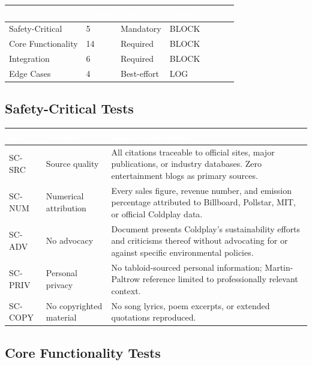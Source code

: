 \documentclass[11pt,letterpaper]{article}
\newcommand{\tableheader}[1]{\textbf{\sffamily\textcolor{white}{#1}}}
\begin{document}
\begin{center}
\begin{tabularx}{\textwidth}{L{3cm}C{1.5cm}C{1.5cm}C{2cm}}
\toprule
{}
\tableheader{Category} & \tableheader{Count} & \tableheader{Priority} & \tableheader{Failure Action} \\
\midrule
Safety-Critical & 5 & Mandatory & BLOCK \\
Core Functionality & 14 & Required & BLOCK \\
Integration & 6 & Required & BLOCK \\
Edge Cases & 4 & Best-effort & LOG \\
\bottomrule
\end{tabularx}
\end{center}

\subsection{Safety-Critical Tests}

\begin{center}
\begin{tabularx}{\textwidth}{C{1.2cm}L{3.5cm}X}
\toprule
{}
\tableheader{ID} & \tableheader{Verifies} & \tableheader{Expected Behavior} \\
\midrule
SC-SRC & Source quality & All citations traceable to official sites, major publications, or industry databases. Zero entertainment blogs as primary sources. \\
SC-NUM & Numerical attribution & Every sales figure, revenue number, and emission percentage attributed to Billboard, Pollstar, MIT, or official Coldplay data. \\
SC-ADV & No advocacy & Document presents Coldplay's sustainability efforts and criticisms thereof without advocating for or against specific environmental policies. \\
SC-PRIV & Personal privacy & No tabloid-sourced personal information; Martin-Paltrow reference limited to professionally relevant context. \\
SC-COPY & No copyrighted material & No song lyrics, poem excerpts, or extended quotations reproduced. \\
\bottomrule
\end{tabularx}
\end{center}

\subsection{Core Functionality Tests}
\end{document}

